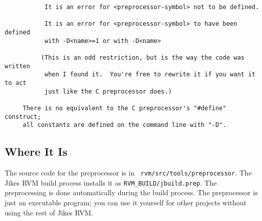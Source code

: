 \begin{verbatim}
           It is an error for <preprocessor-symbol> not to be defined.

           It is an error for <preprocessor-symbol> to have been defined
           with -D<name>=1 or with -D<name>

          (This is an odd restriction, but is the way the code was written
           when I found it.  You're free to rewrite it if you want it to act
           just like the C preprocessor does.)

     There is no equivalent to the C preprocessor's "#define" construct;
     all constants are defined on the command line with "-D".
\end{verbatim}

\subsection{Where It Is}

The source code for the preprocessor is in {\tt
rvm/src/tools/preprocessor}.  The Jikes RVM build process installs it
as {\tt RVM\_BUILD/jbuild.prep}.  The preprocessing is done automatically
during the build process.  The preprocessor is just an executable
program; you can use it yourself for other projects without using the
rest of Jikes RVM.


